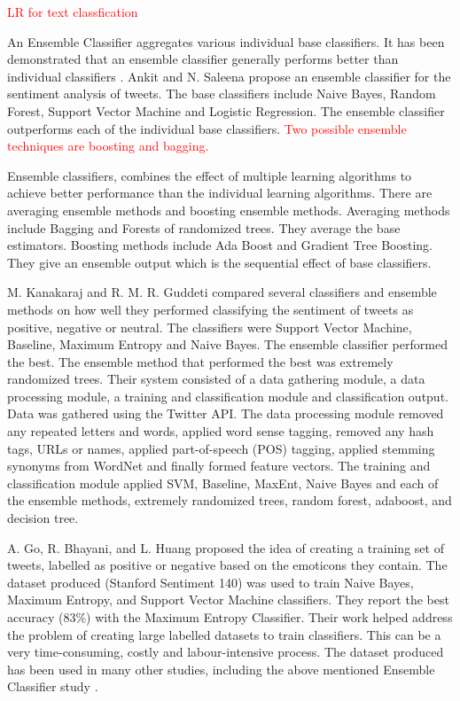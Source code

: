 \textcolor{red}{LR for text classfication}

An Ensemble Classifier aggregates various individual base classifiers. It has been demonstrated that an ensemble classifier generally performs better than individual classifiers \cite{Opitz1999}. Ankit and N. Saleena \cite{Ankit2018} propose an ensemble classifier for the sentiment analysis of tweets. The base classifiers include Naive Bayes, Random Forest, Support Vector Machine and Logistic Regression. The ensemble classifier outperforms each of the individual base classifiers.
\textcolor{red}{Two possible ensemble techniques are boosting and bagging.}

Ensemble classifiers, combines the effect of multiple learning algorithms to achieve better performance than the individual learning algorithms. There are averaging ensemble methods and boosting ensemble methods. Averaging methods include Bagging and Forests of randomized trees. They average the base estimators. Boosting methods include Ada Boost and Gradient Tree Boosting. They give an ensemble output which is the sequential effect of base classifiers. 

M. Kanakaraj and R. M. R. Guddeti \cite{Kanakaraj2015} compared several classifiers and ensemble methods on how well they performed classifying the sentiment of tweets as positive, negative or neutral. The classifiers were Support Vector Machine, Baseline, Maximum Entropy and Naive Bayes. The ensemble classifier performed the best. The ensemble method that performed the best was extremely randomized trees. Their system consisted of a data gathering module, a data processing module, a training and classification module and classification output. Data was gathered using the Twitter API. The data processing module removed any repeated letters and words, applied word sense tagging, removed any hash tags, URLs or names, applied part-of-speech (POS) tagging, applied stemming synonyms from WordNet and finally formed feature vectors. The training and classification module applied SVM, Baseline, MaxEnt, Naive Bayes and each of the ensemble methods, extremely randomized trees, random forest, adaboost, and decision tree.

A. Go, R. Bhayani, and L. Huang \cite{Go2009} proposed the  idea of creating a training set of tweets, labelled as positive or negative based on the emoticons they contain. The dataset produced (Stanford Sentiment 140) was used to train Naive Bayes, Maximum Entropy, and Support Vector Machine classifiers. They report the best accuracy (83\%) with the Maximum Entropy Classifier. Their work helped address the problem of creating large labelled datasets to train classifiers. This can be a very time-consuming, costly and labour-intensive process. The dataset produced has been used in many other studies, including the above mentioned Ensemble Classifier study \cite{Ankit2018}.

